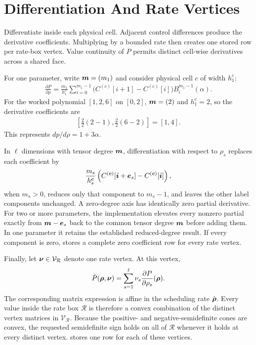 \section{Differentiation And Rate Vertices}
\label{sec:bernstein-differentiation}

Differentiate inside each physical cell. Adjacent control differences produce the derivative coefficients. Multiplying by a bounded rate then creates one stored row per rate-box vertex. Value continuity of $P$ permits distinct cell-wise derivatives across a shared face.

For one parameter, write $\boldsymbol{m}=(m_1)$ and consider physical cell $c$ of width $h_1^c$:
\begin{gather*}
  \frac{\partial P}{\partial\rho}
=\frac{m_1}{h_1^c}\sum_{i=0}^{m_1-1}
    \bigl(C^{(c)}[i+1]-C^{(c)}[i]\bigr)B_i^{m_1-1}(\alpha).
\end{gather*}
For the worked polynomial $[1,2,6]$ on $[0,2]$, $\boldsymbol{m}=(2)$ and $h_1^c=2$, so the derivative coefficients are
\begin{gather*}
  \left[\frac{2}{2}(2-1),\frac{2}{2}(6-2)\right]=[1,4].
\end{gather*}
This represents $dp/d\rho=1+3\alpha$.

In $\ell$ dimensions with tensor degree $\boldsymbol{m}$, differentiation with respect to $\rho_s$ replaces each coefficient by
\begin{gather*}
  \frac{m_s}{h_s^{\boldsymbol{c}}}
  \left(C^{(\boldsymbol{c})}[\boldsymbol{i}+\boldsymbol{e}_s]
       -C^{(\boldsymbol{c})}[\boldsymbol{i}]\right),
\end{gather*}
when $m_s>0$, reduces only that component to $m_s-1$, and leaves the other label components unchanged. A zero-degree axis has identically zero partial derivative. For two or more parameters, the implementation elevates every nonzero partial exactly from $\boldsymbol{m}-\boldsymbol{e}_s$ back to the common tensor degree $\boldsymbol{m}$ before adding them. In one parameter it retains the established reduced-degree result. If every component is zero,  stores a complete zero coefficient row for every rate vertex.

Finally, let $\boldsymbol{\nu}\in\mathcal V_{\mathcal R}$ denote one rate vertex. At this vertex,
\begin{gather*}
  \dot P(\boldsymbol{\rho},\boldsymbol{\nu})=\sum_{s=1}^{\ell}
  \nu_s\frac{\partial P}{\partial\rho_s}(\boldsymbol{\rho}).
\end{gather*}
The corresponding matrix expression is affine in the scheduling rate $\dot{\boldsymbol{\rho}}$. Every value inside the rate box $\mathcal R$ is therefore a convex combination of the distinct vertex matrices in $\mathcal V_{\mathcal R}$. Because the positive- and negative-semidefinite cones are convex, the requested semidefinite sign holds on all of $\mathcal R$ whenever it holds at every distinct vertex.  stores one row for each of these vertices.

